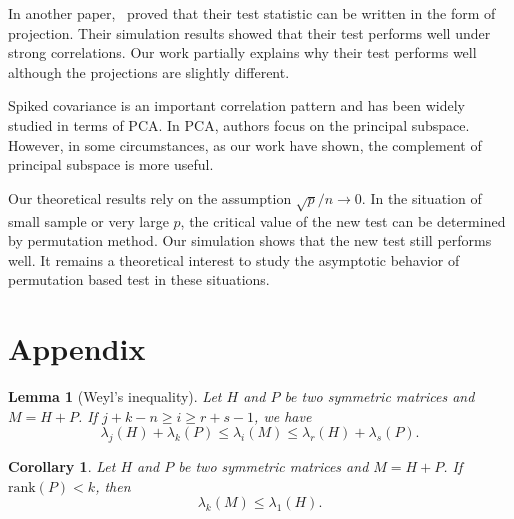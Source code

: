 \documentclass[review]{elsarticle}
\theoremstyle{plain}
\newtheorem{corollary}{\quad\quad Corollary}
\newtheorem{lemma}{\quad\quad Lemma}
\theoremstyle{definition}
\theoremstyle{remark}
\begin{document}
In another paper,~\cite{Zhao2016A} proved that their test statistic can be written in the form of projection. Their simulation results showed that their test performs well under strong correlations.
Our work partially explains why their test performs well although the projections are slightly different. 

 Spiked covariance is an important correlation pattern and has been widely studied in terms of PCA\@.
 In PCA, authors focus on the principal subspace.
 However, in some circumstances, as our work have shown, the complement of principal subspace is more useful. 


Our theoretical results rely on the assumption $\sqrt{p}/n\to 0$. In the situation of small sample or very large $p$, the critical value of the new test can be determined by permutation method. Our simulation shows that the new test still performs well. It remains a theoretical interest to study the asymptotic behavior of permutation based test in these situations.



\section*{Appendix}


\begin{lemma}[Weyl's inequality]
Let $H$ and $P$ be two symmetric matrices and $M=H+P$. If $j+k-n\geq i\geq r+s-1$, we have
\begin{equation*}
\lambda_j(H)+\lambda_k(P)\leq \lambda_i(M) \leq \lambda_r(H)+\lambda_s(P).
\end{equation*}
\end{lemma}
\begin{corollary}\label{WeylCor}
    Let $H$ and $P$ be two symmetric matrices and $M=H+P$. If $\mathrm{rank}(P)< k$, then
    \begin{equation*}
        \lambda_k(M)\leq \lambda_1(H).
    \end{equation*}
\end{corollary}
\end{document}
